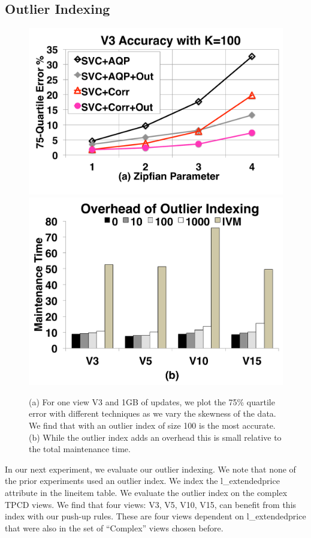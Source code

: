 \subsection{Outlier Indexing}

\begin{figure}[t]
\centering
 \includegraphics[scale=0.14]{exp/msoi_2.pdf}
 \includegraphics[scale=0.14]{exp/msoi_1.pdf}\vspace{-1em}
 \caption{(a) For one view V3 and 1GB of updates, we plot the 75\% quartile error with different techniques as we vary the skewness of the data. We find that \svc with an outlier index of size 100 is the most accurate. (b) While the outlier index adds an overhead this is small relative to the total maintenance time. \vspace{-1.5em}\label{exp5-oi}}
\end{figure}
In our next experiment, we evaluate our outlier indexing.
We note that none of the prior experiments used an outlier index. 
We index the \textsf{l\_extendedprice} attribute in the \textsf{lineitem} table.
We evaluate the outlier index on the complex TPCD views.
We find that four views: V3, V5, V10, V15, can benefit from this index with our push-up rules. 
These are four views dependent on \textsf{l\_extendedprice} that were also in the set of ``Complex'' views chosen before.

